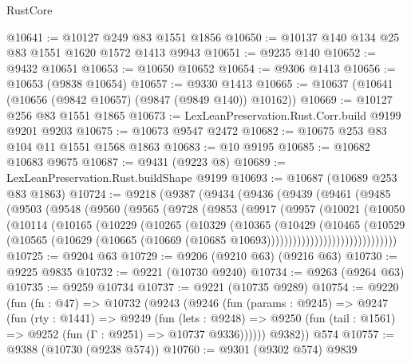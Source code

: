 \begin{lexlean}{RustCore}
\begin{coremodule}
@10641 := @10127 @249 @83 @1551 @1856
@10650 := @10137 @140 @134 @25 @83 @1551 @1620 @1572 @1413 @9943
@10651 := @9235 @140
@10652 := @9432 @10651
@10653 := @10650 @10652
@10654 := @9306 @1413
@10656 := @10653 (@9838 @10654)
@10657 := @9330 @1413
@10665 := @10637 (@10641 (@10656 (@9842 @10657) (@9847 (@9849 @140)) @10162))
@10669 := @10127 @256 @83 @1551 @1865
@10673 := LexLeanPreservation.Rust.Corr.build @9199 @9201 @9203
@10675 := @10673 @9547 @2472
@10682 := @10675 @253 @83 @104 @11 @1551 @1568 @1863
@10683 := @10 @9195
@10685 := @10682 @10683 @9675
@10687 := @9431 (@9223 @8)
@10689 := LexLeanPreservation.Rust.buildShape @9199
@10693 := @10687 (@10689 @253 @83 @1863)
@10724 := @9218
    (@9387
      (@9434
        (@9436
          (@9439
            (@9461
              (@9485
                (@9503
                  (@9548
                    (@9560
                      (@9565
                        (@9728
                          (@9853
                            (@9917
                              (@9957
                                (@10021
                                  (@10050
                                    (@10114
                                      (@10165
                                        (@10229
                                          (@10265
                                            (@10329
                                              (@10365
                                                (@10429
                                                  (@10465
                                                    (@10529
                                                      (@10565
                                                        (@10629
                                                          (@10665
                                                            (@10669
                                                              (@10685
                                                                @10693))))))))))))))))))))))))))))))
@10725 := @9204 @63
@10729 := @9206 (@9210 @63) (@9216 @63)
@10730 := @9225 @9835
@10732 := @9221 (@10730 @9240)
@10734 := @9263 (@9264 @63)
@10735 := @9259 @10734
@10737 := @9221 (@10735 @9289)
@10754 := @9220
    (fun (fn : @47) =>
    @10732
      (@9243
        (@9246
          (fun (params : @9245) =>
          @9247
            (fun (rty : @1441) =>
            @9249
              (fun (lets : @9248) =>
              @9250 (fun (tail : @1561) => @9252 (fun (Γ : @9251) => @10737 @9336))))))
        @9382))
    @574
@10757 := @9388 (@10730 (@9238 @574))
@10760 := @9301 (@9302 @574) @9839

\end{coremodule}
\end{lexlean}
